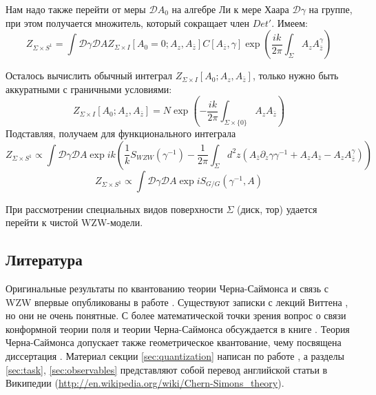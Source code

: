 \documentclass[a4paper,12pt]{article}
\theoremstyle{definition} \newtheorem{Def}{Definition}
\begin{document}
Нам надо также перейти от меры $\mathcal{D}A_0$ на алгебре Ли к мере Хаара $\mathcal{D}\gamma$ на группе, при этом получается множитель, который сокращает член $Det'$. Имеем:
\begin{equation}
  \label{eq:29}
   Z_{\Sigma\times S^1}=\int \mathcal{D}\gamma\mathcal{D}A Z_{\Sigma\times I}[A_0=0; A_z, A_{\bar z}] C[A_{\bar z},\gamma] \exp\left(\frac{ik}{2\pi}\int_{\Sigma}A_z A_{\bar z}^{\gamma}\right)
\end{equation}

Осталось вычислить обычный интеграл $Z_{\Sigma\times I}[A_0;A_z,A_{\bar z}]$, только нужно быть аккуратными с граничными условиями:
\begin{equation}
  \label{eq:30}
  Z_{\Sigma\times I}[A_0;A_z,A_{\bar z}]= N \exp \left( -\frac{ik}{2\pi}\int_{\Sigma\times\{0\}} A_z A_{\bar z}\right)
\end{equation}
Подставляя, получаем для функционального интеграла
\begin{equation}
  \label{eq:31}
    Z_{\Sigma\times S^1}\propto\int \mathcal{D}\gamma\mathcal{D}A \exp ik\left(\frac{1}{k}S_{WZW}(\gamma^{-1})-\frac{1}{2\pi}\int_{\Sigma}d^2z (A_{\bar z}\partial_z \gamma \gamma^{-1}+A_zA_{\bar z}-A_z A_{\bar z}^{\gamma})\right)
\end{equation}
\begin{equation}
  \label{eq:32}
  Z_{\Sigma\times S^1}\propto\int \mathcal{D}\gamma\mathcal{D}A \exp iS_{G/G}(\gamma^{-1},A)
\end{equation}

При рассмотрении специальных видов поверхности $\Sigma$ (диск, тор) удается перейти к чистой WZW-модели.

\subsection{Литература}
\label{sec:cs-literature}

Оригинальные результаты по квантованию теории Черна-Саймонса и связь с WZW впервые опубликованы в работе \cite{witten1989quantum}. Существуют записки с лекций Виттена \cite{hu2001lecture}, но они не очень понятные. С более математической точки зрения вопрос о связи конформной теории поля и теории Черна-Саймонса обсуждается в книге \cite{kohno2002conformal}. Теория Черна-Саймонса допускает также геометрическое квантование, чему посвящена диссертация \cite{axelrod1991geometric}. Материал секции \ref{sec:quantization} написан по работе \cite{blau1993derivation}, а разделы \ref{sec:task}, \ref{sec:observables} представляют собой перевод английской статьи в Википедии (\url{http://en.wikipedia.org/wiki/Chern-Simons_theory}).

{}

\end{document}
